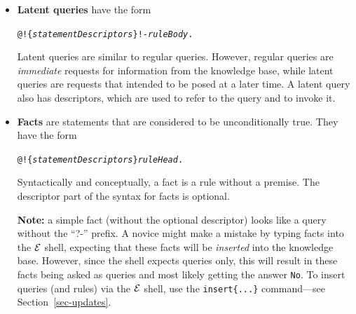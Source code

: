 \documentclass[11pt]{article}
\newcommand{\ERGO}{\mbox{\ensuremath{\cal{E}}\smaller{{\sc{RGO}}}}\xspace}
\newcommand{\FLSYSTEM}{\ERGO}
\begin{document}
\begin{itemize}
  \textbf{Note:} the prefix ``\texttt{?-}'' in front of a query is used
  \emph{only} if the query is in a file. In the \FLSYSTEM shell,
  this prefix is \emph{not} used (and will cause a syntax error or a
  warning)
  because the \ERGO command line expects queries only---typing rules, directives and
  other constructs will result in errors.
\item \textbf{Latent queries} have the form
\begin{alltt}
     @!\{\emph{statementDescriptors}\}  !- \emph{ruleBody}.
\end{alltt}
  Latent queries are similar to regular queries. However, regular
  queries are \emph{immediate} requests for information
  from the knowledge base, while latent queries are requests that intended to
  be posed at a later time.  A latent query also has descriptors, which are
  used to refer to the query and to invoke it.
\item \textbf{Facts} are statements that are considered to be
  unconditionally true. They have the form\
\begin{alltt}
     @!\{\emph{statementDescriptors}\}  \emph{ruleHead}.
\end{alltt}
  Syntactically and conceptually, a fact is a rule without a premise.
  The descriptor part of the syntax for facts is optional.

  \textbf{Note:} a simple fact (without the optional descriptor) looks
  like a query without the ``?-'' prefix. A novice might make a mistake
  by typing facts into the \FLSYSTEM shell, expecting that these facts
  will be \emph{inserted} into the knowledge base. However, since the shell
  expects queries only, this will result in these facts being asked as queries
  and most likely getting the answer \texttt{No}. To insert queries (and
  rules) via the \FLSYSTEM shell, use the \texttt{insert\{...\}}
  command---see Section~\ref{sec-updates}.
\end{itemize}
\end{document}
